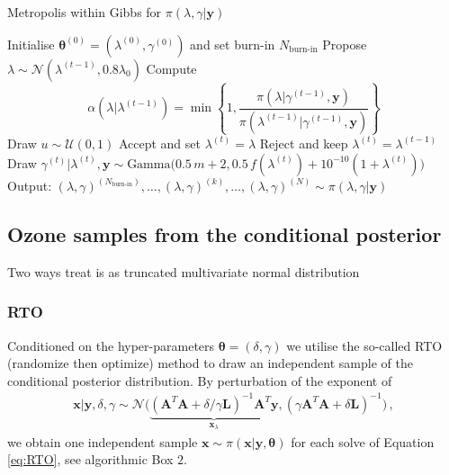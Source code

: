 \begin{algorithm}[!ht]
	\caption{Metropolis within Gibbs for $\pi(\lambda, \gamma | \bm{y})$}
	\begin{algorithmic}[1]
		\STATE Initialise  \( \bm{\theta}^{(0)}  =( \lambda^{(0)} , \gamma^{(0)}  ) \) and set burn-in $N_{\text{burn-in}}$
		\STATE Propose \( \lambda \sim \mathcal{N}(\lambda^{(t-1)}, 0.8 \lambda_0)  \)
		\STATE Compute
		\[ \alpha( \lambda  | \lambda^{(t-1)}) = \min \left\{ 1, \frac{\pi(\lambda | \gamma^{(t-1)}, \bm{y})  }{\pi(\lambda^{(t-1)}| \gamma^{(t-1)}, \bm{y})}  \right\} \]
		\STATE Draw $u \sim \mathcal{U}(0,1)$
		\STATE Accept and set \( \lambda^{(t)} = \lambda \)
		\ELSE  
		\STATE Reject and keep \(\lambda^{(t)} = \lambda^{(t-1)} \)
		\ENDIF
		\STATE Draw $\gamma^{(t)} | \lambda^{(t)} ,\bm{y} \sim \text{Gamma} \big( 0.5  \, m + 2, 0.5 \, f(\lambda^{(t)}) + 10^{-10}(1 + \lambda^{(t)}) \big) $
		\ENDFOR
		\STATE Output: $ (\lambda, \gamma)^{(N_{\text{burn-in}})}, \dots,  (\lambda, \gamma)^{(k)} , \dots,   (\lambda, \gamma)^{(N)} \sim \pi(\lambda, \gamma| \bm{y}) $
	\end{algorithmic}
\end{algorithm}

\subsection{Ozone samples from the conditional posterior}
Two ways
treat is as truncated multivariate normal distribution
\subsubsection{RTO}
Conditioned on the hyper-parameters $\bm{\theta} = ( \delta, \gamma)$ we utilise the so-called RTO (randomize then optimize) method \cite{bardsley2012mcmc,bardsley2015randomize, fox2016fast} to draw an independent sample of the conditional posterior distribution.
By perturbation of the exponent of
\begin{align}
	\bm{x}| \bm{y} ,\delta, \gamma \sim \mathcal{N}\big( \underbrace{ (\bm{A}^T \bm{A} + \delta / \gamma \bm{L} )^{-1} \bm{A}^T \bm{y}}_{\bm{x}_{\lambda}}, (\gamma \bm{A}^T \bm{A} + \delta \bm{L} )^{-1} \big) \, \label{eq:CondPost},
\end{align}
we obtain one independent sample $\bm{x} \sim \pi(\bm{x}|\bm{y}, \bm{\theta})$ for each solve of Equation \eqref{eq:RTO}, see algorithmic Box $2$.


